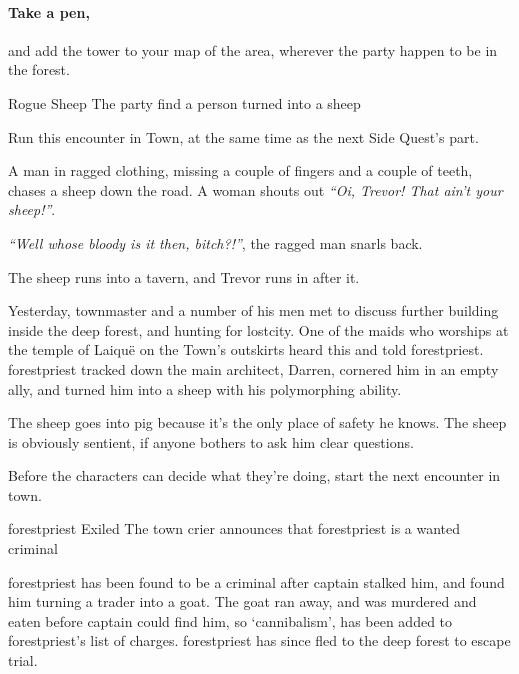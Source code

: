 \begin{multicols}{2}
\paragraph{Take a pen,}
and add the tower to your map of the area, wherever the party happen to be in the forest.

{\squash Rogue Sheep}%
{The party find a person turned into a sheep}%

Run this encounter in Town, at the same time as the next Side Quest's part.

\begin{boxtext}

  A man in ragged clothing, missing a couple of fingers and a couple of teeth, chases a sheep down the road.  A woman shouts out \emph{``Oi, Trevor! That ain't your sheep!''}.

  \emph{``Well whose bloody is it then, bitch?!''}, the ragged man snarls back.

  The sheep runs into a tavern, and Trevor runs in after it.

\end{boxtext}

Yesterday, \gls{townmaster} and a number of his men met to discuss further building inside the deep forest, and hunting for \gls{lostcity}.
One of the maids who worships at the temple of Laiqu\"{e} on the Town's outskirts heard this and told \gls{forestpriest}.
\Gls{forestpriest} tracked down the main architect, Darren, cornered him in an empty ally, and turned him into a sheep with his polymorphing ability.

The sheep goes into \gls{pig} because it's the only place of safety he knows.  The sheep is obviously sentient, if anyone bothers to ask him clear questions.

Before the characters can decide what they're doing, start the next encounter in \gls{town}.

{\Gls{forestpriest} Exiled}%
{The town crier announces that \gls{forestpriest} is a wanted criminal}%

\Gls{forestpriest} has been found to be a criminal after \gls{captain} stalked him, and found him turning a trader into a goat.
The goat ran away, and was murdered and eaten before \gls{captain} could find him, so `cannibalism', has been added to \gls{forestpriest}'s list of charges.
\Gls{forestpriest} has since fled to the deep forest to escape trial.

\begin{speechtext}


\end{speechtext}
\end{multicols}
